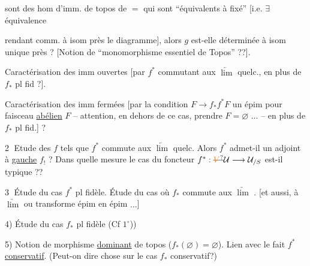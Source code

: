 sont des hom d'imm. de topos de \(=\)   qui sont ``équivalents à   fixé'' [i.e. \(\exists\) équivalence


rendant comm. à isom près le diagramme], alors \(g\) est-elle déterminée à isom unique près ? [Notion de ``monomorphisme essentiel de Topos'' ??].

Caractérisation des imm ouvertes [par \(f^*\) commutant aux \(\underleftarrow{\lim}\) quelc., en plus de \(f_*\) pl fid ?].


Caractérisation des imm fermées [par la condition \(F\longrightarrow f_*f^*F\) un épim pour  faisceau \uline{abélien} \(F\) -- attention,  en dehors de ce cas, prendre \(F=\varnothing\) \(\ldots\) -- en plus de \(f_*\) pl fid.] ?


\textcircled{2} Etude des \(f\) tels que \(f^*\) commute aux \(\underleftarrow{\lim}\) quelc. Alors \(f^*\)  admet-il un adjoint à \uline{gauche}  \(f_!\) ? Dans quelle mesure le cas du foncteur  \(f^*:\deleted{\unsure{V}}\mathcal U\longrightarrow\mathcal U_{/S}\) est-il typique ??



\textcircled{3} Étude du cas \(f^*\) pl fidèle. Étude du cas où \(f_*\) commute aux \(\underrightarrow{\lim}\) . [et aussi, à  \(\underrightarrow{\lim}\) ou transforme épim en épim \(\ldots\)] 

4) Étude du cas \(f_*\) pl fidèle (Cf \(1^\circ\)))

5) Notion de morphisme \uline{dominant} de topos (\(f_*(\varnothing)=\varnothing\)).  Lien avec le fait \(f^*\) \uline{conservatif}.  (Peut-on dire  chose sur le cas \(f_*\) conservatif?)

